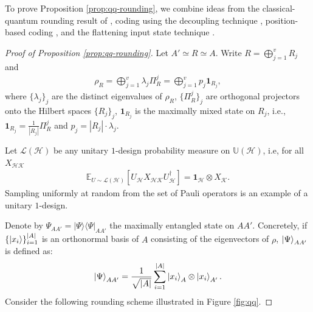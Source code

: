 \documentclass[a4paper,onecolumn,11pt,accepted=2025-10-01]{quantumarticle}
\newcommand*{\cH}{\mathcal{H}}
\newcommand*{\cK}{\mathcal{K}}
\newcommand*{\cL}{\mathcal{L}}
\newcommand*{\proj}[1]{|#1\rangle\!\langle #1|}
\newcommand*{\exs}[2]{\mathbb{E}_{#1}\left[#2 \right]}
\begin{document}
To prove Proposition \ref{prop:qq-rounding}, we combine ideas from the classical-quantum rounding result of \cite{Fawzi19}, coding using the decoupling technique \cite{Hsieh2008Jun,Li2023Nov}, position-based coding \cite{Anshu2018Jun}, and the flattening input state technique \cite{Li2023Nov}. 
\begin{proof}[Proof of Proposition \ref{prop:qq-rounding}]Let $A' \simeq R\simeq A$. Write $R= \bigoplus_{j=1}^{v } R_j$ and
    \begin{align}
        \rho_R = \bigoplus_{j=1}^{v} \lambda_j \Pi^j_R = \bigoplus_{j=1}^{v} p_j \mathbf{1}_{R_j},
    \end{align}
where $\{\lambda_j\}_j$ are the distinct eigenvalues of $\rho_R$, $\{\Pi^j_R\}_j$ are orthogonal projectors onto the Hilbert spaces $\{R_j\}_j$, $\mathbf{1}_{R_j}$ is the maximally mixed state on $R_j$, i.e., $\mathbf{1}_{R_j}=\frac{1}{|R_j|}\Pi^j_R$ and $p_j = |R_j|\cdot \lambda_j$.

Let $\cL(\cH)$ be any unitary $1$-design probability measure on $\mathbb{U}(\cH)$, i.e, for all $X_{\cH \cK}$
\begin{align}
    \exs{U \sim \cL(\cH)}{U_{\cH}X_{\cH \cK}U_{\cH}^\dagger}=\mathbf{1}_{\cH} \otimes X_\cK. 
\end{align}
Sampling uniformly at random from the  set of Pauli operators is an example of a unitary $1$-design. 

Denote by $\Psi_{A A'} = \proj{\Psi}_{A A'}$ the maximally entangled state on $AA'$. Concretely, if $\{\ket{x_i}\}_{i=1}^{|A|}$ is an orthonormal basis of $A$ consisting of the eigenvectors of $\rho$, $\ket{\Psi}_{A A'}$ is defined as:
\begin{align}
    \ket{\Psi}_{A A'}= \frac{1}{\sqrt{|A|}}\sum_{i=1}^{|A|} \ket{x_i}_{A}\otimes \ket{x_i}_{A'}.
\end{align}
Consider the following rounding scheme illustrated in Figure \ref{fig:qq}.


\end{proof}
\end{document}
